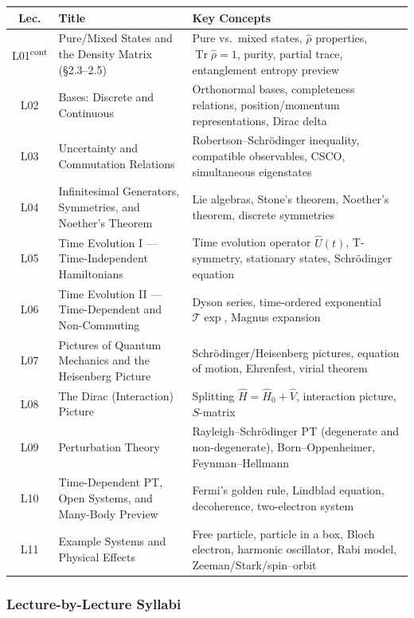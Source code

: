 \documentclass[11pt,a4paper]{article}
\begin{document}
\begin{center}
\begin{tabularx}{\textwidth}{clX}
\toprule
\textbf{Lec.} & \textbf{Title} & \textbf{Key Concepts}\\
\midrule
L01\textsuperscript{cont} & Pure/Mixed States and the Density Matrix (\S2.3--2.5) &
    Pure vs.\ mixed states, $\hat{\rho}$ properties, $\operatorname{Tr}\hat{\rho}=1$, purity, partial trace, entanglement entropy preview\\
L02 & Bases: Discrete and Continuous &
    Orthonormal bases, completeness relations, position/momentum representations, Dirac delta\\
L03 & Uncertainty and Commutation Relations &
    Robertson--Schr\"odinger inequality, compatible observables, CSCO, simultaneous eigenstates\\
L04 & Infinitesimal Generators, Symmetries, and Noether's Theorem &
    Lie algebras, Stone's theorem, Noether's theorem, discrete symmetries\\
L05 & Time Evolution I --- Time-Independent Hamiltonians &
    Time evolution operator $\hat{U}(t)$, T-symmetry, stationary states, Schr\"odinger equation\\
L06 & Time Evolution II --- Time-Dependent and Non-Commuting &
    Dyson series, time-ordered exponential $\mathcal{T}\exp$, Magnus expansion\\
L07 & Pictures of Quantum Mechanics and the Heisenberg Picture &
    Schr\"odinger/Heisenberg pictures, equation of motion, Ehrenfest, virial theorem\\
L08 & The Dirac (Interaction) Picture &
    Splitting $\hat{H}=\hat{H}_0+\hat{V}$, interaction picture, $S$-matrix\\
L09 & Perturbation Theory &
    Rayleigh--Schr\"odinger PT (degenerate and non-degenerate), Born--Oppenheimer, Feynman--Hellmann\\
L10 & Time-Dependent PT, Open Systems, and Many-Body Preview &
    Fermi's golden rule, Lindblad equation, decoherence, two-electron system\\
L11 & Example Systems and Physical Effects &
    Free particle, particle in a box, Bloch electron, harmonic oscillator,
    Rabi model, Zeeman/Stark/spin--orbit\\
\bottomrule
\end{tabularx}
\end{center}

\subsubsection*{Lecture-by-Lecture Syllabi}
\end{document}
